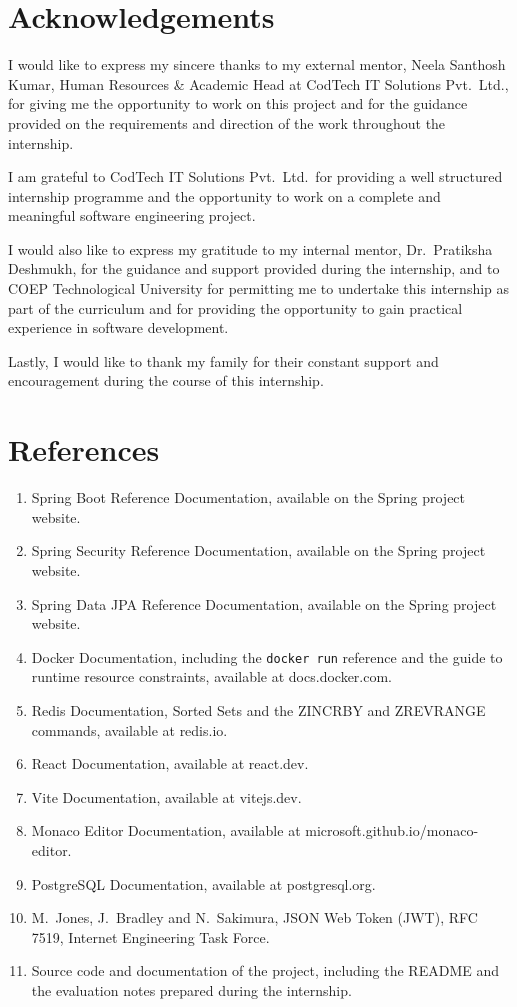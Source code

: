 \documentclass[12pt,a4paper]{report}
\begin{document}
\chapter*{Acknowledgements}

I would like to express my sincere thanks to my external mentor, Neela Santhosh Kumar, Human Resources \& Academic Head at CodTech IT Solutions Pvt.\ Ltd., for giving me the opportunity to work on this project and for the guidance provided on the requirements and direction of the work throughout the internship.

I am grateful to CodTech IT Solutions Pvt.\ Ltd.\ for providing a well structured internship programme and the opportunity to work on a complete and meaningful software engineering project.

I would also like to express my gratitude to my internal mentor, Dr.\ Pratiksha Deshmukh, for the guidance and support provided during the internship, and to COEP Technological University for permitting me to undertake this internship as part of the curriculum and for providing the opportunity to gain practical experience in software development.

Lastly, I would like to thank my family for their constant support and encouragement during the course of this internship.

\chapter*{References}

\begin{enumerate}
    \item Spring Boot Reference Documentation, available on the Spring project website.
    \item Spring Security Reference Documentation, available on the Spring project website.
    \item Spring Data JPA Reference Documentation, available on the Spring project website.
    \item Docker Documentation, including the \texttt{docker run} reference and the guide to runtime resource constraints, available at docs.docker.com.
    \item Redis Documentation, Sorted Sets and the ZINCRBY and ZREVRANGE commands, available at redis.io.
    \item React Documentation, available at react.dev.
    \item Vite Documentation, available at vitejs.dev.
    \item Monaco Editor Documentation, available at microsoft.github.io/monaco-editor.
    \item PostgreSQL Documentation, available at postgresql.org.
    \item M.\ Jones, J.\ Bradley and N.\ Sakimura, JSON Web Token (JWT), RFC 7519, Internet Engineering Task Force.
    \item Source code and documentation of the project, including the README and the evaluation notes prepared during the internship.
\end{enumerate}
\end{document}
